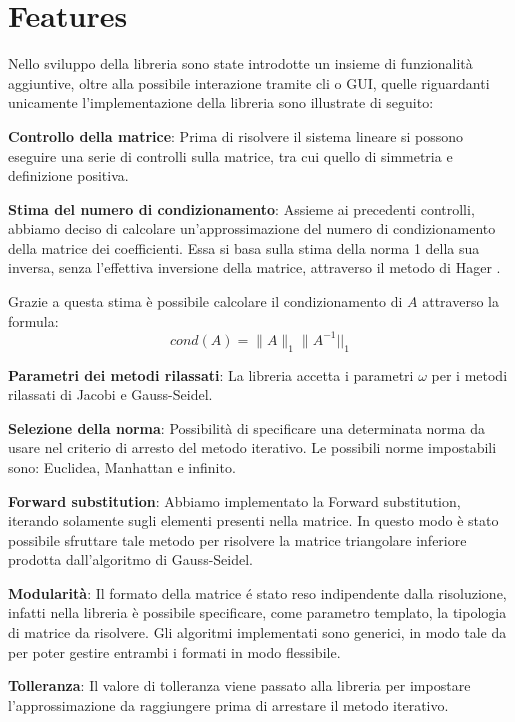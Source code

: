 \section{Features}

Nello sviluppo della libreria sono state introdotte un insieme di funzionalità aggiuntive, oltre alla possibile interazione tramite cli o GUI, quelle riguardanti unicamente l'implementazione della libreria sono illustrate di seguito:

\begin{itemize}
	\begin{item}
		\textbf{Controllo della matrice}: Prima di risolvere il sistema lineare si possono eseguire una serie di controlli sulla matrice, tra cui quello di simmetria e definizione positiva.
	\end{item}
	\begin{item}
		\textbf{Stima del numero di condizionamento}: Assieme ai precedenti controlli, abbiamo deciso di calcolare un'approssimazione del numero di condizionamento della matrice dei coefficienti. Essa si basa sulla stima della norma 1 della sua inversa, senza l'effettiva inversione della matrice, attraverso il metodo di Hager \cite{hager, hager2}.
		
		Grazie a questa stima è possibile calcolare il condizionamento di $A$ attraverso la formula:
		$$ cond(A) = \|A\|_1  \|A^{-1}||_1$$
			
			\end{item}
	\begin{item}
		\textbf{Parametri dei metodi rilassati}: La libreria accetta i parametri $\omega$ per i metodi rilassati di Jacobi e Gauss-Seidel.
	\end{item}
	\begin{item}
		\textbf{Selezione della norma}: Possibilità di specificare una determinata norma da usare nel criterio di arresto del metodo iterativo. Le possibili norme impostabili sono: Euclidea, Manhattan e infinito.
	\end{item}
	\begin{item}
		\textbf{Forward substitution}: Abbiamo implementato la Forward substitution, iterando solamente sugli elementi presenti nella matrice. In questo modo è stato possibile sfruttare tale metodo per risolvere la matrice triangolare inferiore prodotta dall'algoritmo di Gauss-Seidel.
	\end{item}
	\begin{item}
		\textbf{Modularità}: Il formato della matrice é stato reso indipendente dalla risoluzione, infatti nella libreria è possibile specificare, come parametro templato, la tipologia di matrice da risolvere. Gli algoritmi implementati sono generici, in modo tale da per poter gestire entrambi i formati in modo flessibile.
	\end{item}
	\begin{item}
		\textbf{Tolleranza}: Il valore di tolleranza viene passato alla libreria per impostare l'approssimazione da raggiungere prima di arrestare il metodo iterativo.
	\end{item}

\end{itemize}